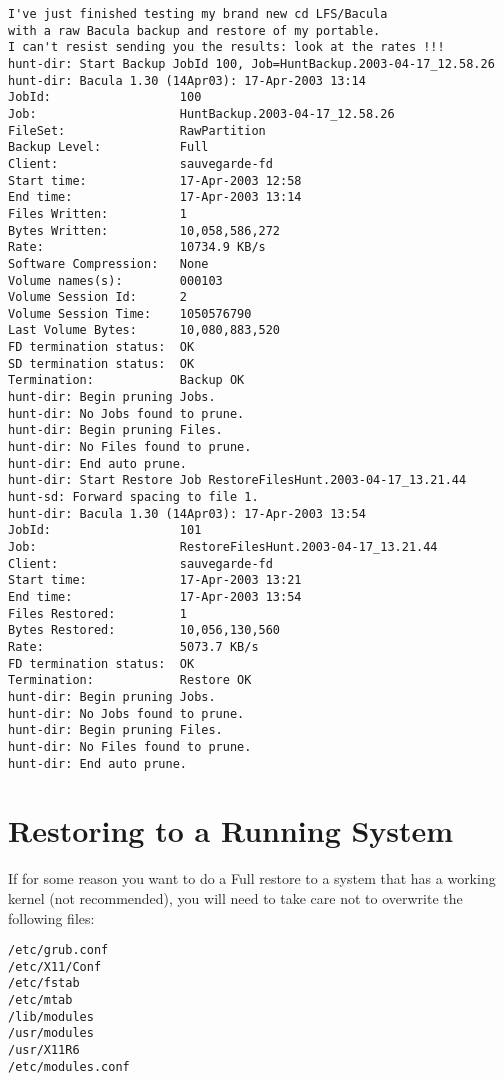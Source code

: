 \footnotesize
\begin{verbatim}
I've just finished testing my brand new cd LFS/Bacula
with a raw Bacula backup and restore of my portable.
I can't resist sending you the results: look at the rates !!!
hunt-dir: Start Backup JobId 100, Job=HuntBackup.2003-04-17_12.58.26
hunt-dir: Bacula 1.30 (14Apr03): 17-Apr-2003 13:14
JobId:                  100
Job:                    HuntBackup.2003-04-17_12.58.26
FileSet:                RawPartition
Backup Level:           Full
Client:                 sauvegarde-fd
Start time:             17-Apr-2003 12:58
End time:               17-Apr-2003 13:14
Files Written:          1
Bytes Written:          10,058,586,272
Rate:                   10734.9 KB/s
Software Compression:   None
Volume names(s):        000103
Volume Session Id:      2
Volume Session Time:    1050576790
Last Volume Bytes:      10,080,883,520
FD termination status:  OK
SD termination status:  OK
Termination:            Backup OK
hunt-dir: Begin pruning Jobs.
hunt-dir: No Jobs found to prune.
hunt-dir: Begin pruning Files.
hunt-dir: No Files found to prune.
hunt-dir: End auto prune.
hunt-dir: Start Restore Job RestoreFilesHunt.2003-04-17_13.21.44
hunt-sd: Forward spacing to file 1.
hunt-dir: Bacula 1.30 (14Apr03): 17-Apr-2003 13:54
JobId:                  101
Job:                    RestoreFilesHunt.2003-04-17_13.21.44
Client:                 sauvegarde-fd
Start time:             17-Apr-2003 13:21
End time:               17-Apr-2003 13:54
Files Restored:         1
Bytes Restored:         10,056,130,560
Rate:                   5073.7 KB/s
FD termination status:  OK
Termination:            Restore OK
hunt-dir: Begin pruning Jobs.
hunt-dir: No Jobs found to prune.
hunt-dir: Begin pruning Files.
hunt-dir: No Files found to prune.
hunt-dir: End auto prune.
\end{verbatim}
\normalsize

\label{running}

\section{Restoring to a Running System}

If for some reason you want to do a Full restore to a system that has a
working kernel (not recommended), you will need to take care not to
overwrite the following files:

\footnotesize
\begin{verbatim}
/etc/grub.conf
/etc/X11/Conf
/etc/fstab
/etc/mtab
/lib/modules
/usr/modules
/usr/X11R6
/etc/modules.conf
\end{verbatim}
\normalsize

